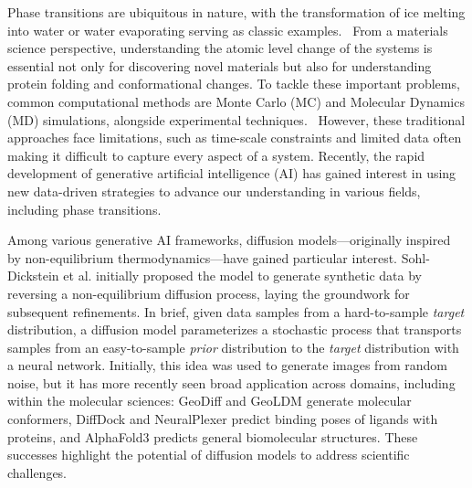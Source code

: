 \documentclass[aip,jcp,reprint,longbibliography]{revtex4-1}
\begin{document}
Phase transitions are ubiquitous in nature, with the transformation of ice melting into water or water evaporating serving as classic examples.~\cite{stanley1987introduction} From a materials science perspective, understanding the atomic level change of the systems is essential not only for discovering novel materials but also for understanding protein folding and conformational changes.\cite{dill2012the}
To tackle these important problems, common computational methods are Monte Carlo (MC) and Molecular Dynamics (MD) simulations, alongside experimental techniques.~\cite{James1980Monte,Karplus2002molecular,sosso2016crystal,beyerle2023recent,wang2024atomic} However, these traditional approaches face limitations, such as time-scale constraints and limited data often making it difficult to capture every aspect of a system. Recently, the rapid development of generative artificial intelligence (AI) has gained interest in using new data-driven strategies to advance our understanding in various fields, including phase transitions. 


Among various generative AI frameworks, diffusion models—originally inspired by non-equilibrium thermodynamics—have gained particular interest.\cite{dickstein2015deep,ho2020denoising,song2021scorebased,song2021denoising} Sohl-Dickstein et al.\cite{dickstein2015deep} initially proposed the model to generate synthetic data by reversing a non-equilibrium diffusion process, laying the groundwork for subsequent refinements.\cite{ho2020denoising,song2021scorebased,song2021denoising} In brief, given data samples from a hard-to-sample {\it target} distribution, a diffusion model parameterizes a stochastic process that transports samples from an easy-to-sample {\it prior} distribution to the {\it target} distribution with a neural network. Initially, this idea was used to generate images from random noise, but it has more recently seen broad application across domains, including within the molecular sciences: GeoDiff\cite{xu2022geodiff} and GeoLDM\cite{xu2023geometric} generate molecular conformers, DiffDock\cite{corso2023diffdock} and NeuralPlexer\cite{qiao2024state} predict binding poses of ligands with proteins, and AlphaFold3\cite{Abramson2024accurate} predicts general biomolecular structures. These successes highlight the potential of diffusion models to address scientific challenges.\cite{tiwary2024generative} 
\end{document}
